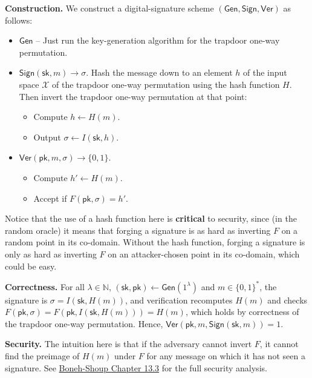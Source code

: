 \documentclass[
  letterpaper,
]{scrbook}
\providecommand{\tightlist}{%
  \setlength{\itemsep}{0pt}\setlength{\parskip}{0pt}}
\newcommand{\N}{\mathbb{N}}
\newcommand{\zo}{\{0,1\}}
\newcommand{\calX}{\mathcal{X}}
\newcommand{\Gen}{\mathsf{Gen}}
\newcommand{\Sign}{\mathsf{Sign}}
\newcommand{\Ver}{\mathsf{Ver}}
\newcommand{\sk}{\mathsf{sk}}
\newcommand{\pk}{\mathsf{pk}}
\theoremstyle{definition}
\theoremstyle{plain}
\theoremstyle{plain}
\theoremstyle{remark}
\begin{document}
\textbf{Construction.} We construct a digital-signature scheme
\((\Gen, \Sign, \Ver)\) as follows:

\begin{itemize}
\tightlist
\item
  \(\Gen\) -- Just run the key-generation algorithm for the trapdoor
  one-way permutation.
\item
  \(\Sign(\sk, m) \to \sigma\). Hash the message down to an element
  \(h\) of the input space \(\calX\) of the trapdoor one-way permutation
  using the hash function \(H\). Then invert the trapdoor one-way
  permutation at that point:

  \begin{itemize}
  \tightlist
  \item
    Compute \(h \gets H(m)\).
  \item
    Output \(\sigma \gets I(\sk, h)\).
  \end{itemize}
\item
  \(\Ver(\pk, m, \sigma) \to \zo.\)

  \begin{itemize}
  \tightlist
  \item
    Compute \(h' \gets H(m)\).
  \item
    Accept if \(F(\pk, \sigma) = h'\).
  \end{itemize}
\end{itemize}

Notice that the use of a hash function here is \textbf{critical} to
security, since (in the random oracle) it means that forging a signature
is as hard as inverting \(F\) on a random point in its co-domain.
Without the hash function, forging a signature is only as hard as
inverting \(F\) on an attacker-chosen point in its co-domain, which
could be easy.

\textbf{Correctness.} For all \(\lambda \in \N\),
\((\sk, \pk) \gets \Gen(1^\lambda)\) and \(m \in \zo^*\), the signature
is \(\sigma = I(\sk, H(m))\), and verification recomputes \(H(m)\) and
checks \(F(\pk, \sigma) = F(\pk, I(\sk, H(m))) = H(m)\), which holds by
correctness of the trapdoor one-way permutation. Hence,
\(\Ver(\pk, m, \Sign(\sk, m)) = 1\).

\textbf{Security.} The intuition here is that if the adversary cannot
invert \(F\), it cannot find the preimage of \(H(m)\) under \(F\) for
any message on which it has not seen a signature. See
\href{https://toc.cryptobook.us/book.pdf\#page=550}{Boneh-Shoup Chapter
13.3} for the full security analysis.
\end{document}
